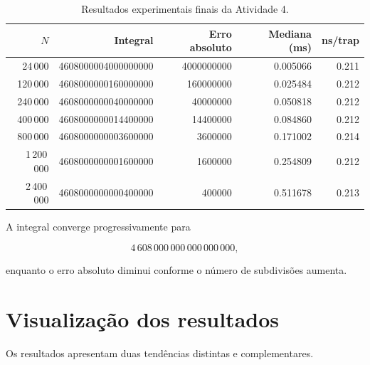 \begin{table}[htbp]
    \centering
    \caption{Resultados experimentais finais da Atividade 4.}
    \label{tab:atvd04-resultados}
    \small
    \begin{tabular}{r|r|r|r|r}
        \hline
        \(N\) &
        Integral &
        Erro absoluto &
        Mediana (ms) &
        ns/trap \\
        \hline
        24\,000 &
        4608000004000000000 &
        4000000000 &
        0.005066 &
        0.211 \\

        120\,000 &
        4608000000160000000 &
        160000000 &
        0.025484 &
        0.212 \\

        240\,000 &
        4608000000040000000 &
        40000000 &
        0.050818 &
        0.212 \\

        400\,000 &
        4608000000014400000 &
        14400000 &
        0.084860 &
        0.212 \\

        800\,000 &
        4608000000003600000 &
        3600000 &
        0.171002 &
        0.214 \\

        1\,200\,000 &
        4608000000001600000 &
        1600000 &
        0.254809 &
        0.212 \\

        2\,400\,000 &
        4608000000000400000 &
        400000 &
        0.511678 &
        0.213 \\
        \hline
    \end{tabular}
\end{table}

A integral converge progressivamente para

\begin{equation}
    4\,608\,000\,000\,000\,000\,000,
\end{equation}

enquanto o erro absoluto diminui conforme o número de subdivisões aumenta.


\section{Visualização dos resultados}

\label{sec:atvd04-visualizacao}

Os resultados apresentam duas tendências distintas e complementares.

